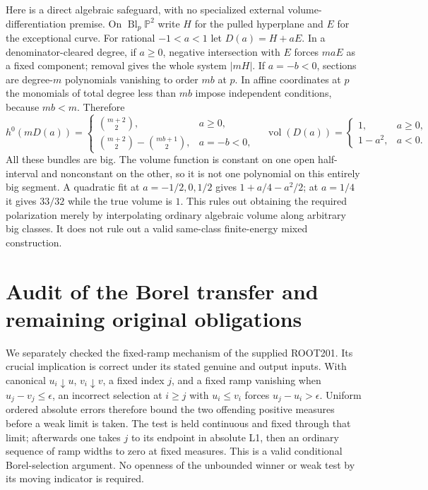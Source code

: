 \documentclass[10pt]{article}
\newcommand{\vol}{\operatorname{vol}}
\begin{document}
Here is a direct algebraic safeguard, with no specialized external
volume-differentiation premise. On $\operatorname{Bl}_p\mathbb P^2$
write $H$ for the pulled hyperplane and $E$ for the exceptional curve.
For rational $-1<a<1$ let $D(a)=H+aE$. In a denominator-cleared
degree, if $a\geq0$, negative intersection with $E$ forces $maE$
as a fixed component; removal gives the whole system $|mH|$.
If $a=-b<0$, sections are degree-$m$ polynomials vanishing to order
$mb$ at $p$. In affine coordinates at $p$ the monomials of total
degree less than $mb$ impose independent conditions, because $mb<m$.
Therefore
\[
 h^0(mD(a))=\begin{cases}
 \binom{m+2}{2},&a\geq0,\\
 \binom{m+2}{2}-\binom{mb+1}{2},&a=-b<0,
 \end{cases}
\quad
 \vol(D(a))=\begin{cases}1,&a\geq0,\\1-a^2,&a<0.\end{cases} \tag{11}
\]
All these bundles are big. The volume function is constant on one
open half-interval and nonconstant on the other, so it is not one
polynomial on this entirely big segment. A quadratic fit at
$a=-1/2,0,1/2$ gives $1+a/4-a^2/2$; at $a=1/4$ it gives
$33/32$ while the true volume is $1$. This rules out obtaining the
required polarization merely by interpolating ordinary algebraic
volume along arbitrary big classes. It does not rule out a valid
same-class finite-energy mixed construction.

\section{Audit of the Borel transfer and remaining original obligations}
We separately checked the fixed-ramp mechanism of the supplied ROOT201.
Its crucial implication is correct under its stated genuine and output
inputs. With canonical $u_i\downarrow u$, $v_i\downarrow v$, a fixed
index $j$, and a fixed ramp vanishing when $u_j-v_j\leq\epsilon$,
an incorrect selection at $i\geq j$ with $u_i\leq v_i$ forces
$u_j-u_i>\epsilon$. Uniform ordered absolute errors therefore bound
the two offending positive measures before a weak limit is taken.
The test is held continuous and fixed through that limit; afterwards
one takes $j$ to its endpoint in absolute L1, then an ordinary
sequence of ramp widths to zero at fixed measures. This is a valid
conditional Borel-selection argument. No openness of the unbounded
winner or weak test by its moving indicator is required.
\end{document}
